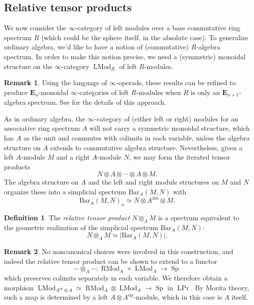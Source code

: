 \documentclass[12pt]{article}
\theoremstyle{definition}
\newtheorem{definition}{Definition}[subsection]
\newtheorem{remark}{Remark}[subsection]
\newcommand{\EE}{\mathbf{E}}
\newcommand{\too}{\longrightarrow}
\newcommand{\op}{\mathrm{op}}
\DeclareMathOperator{\LMod}{LMod}
\DeclareMathOperator{\RMod}{RMod}
\DeclareMathOperator{\Prl}{LPr}
\DeclareMathOperator{\Sp}{Sp}
\begin{document}
\subsection{Relative tensor products}\label{sec:rtp}


We now consider the $\infty$-category of left modules over a base commutative ring spectrum $R$ (which could be the sphere itself, in the absolute case).
To generalize ordinary algebra, we'd like to have a notion of (commutative) $R$-algebra spectrum.
In order to make this notion precise, we need a (symmetric) monoidal structure on the $\infty$-category $\LMod_R$ of left $R$-modules.
\begin{remark}
Using the language of $\infty$-operads, these results can be refined to produce $\EE_n$-monoidal $\infty$-categories of left $R$-modules when $R$ is only an $\EE_{n+1}$-algebra spectrum.
See \cite{HA} for the details of this approach.
\end{remark}

As in ordinary algebra, the $\infty$-category of (either left or right) modules for an associative ring spectrum $A$ will not carry a symmetric monoidal structure, which has $A$ as the unit and commutes with colimits in each variable, unless the algebra structure on $A$ extends to commutative algebra structure.
Nevertheless, given a left $A$-module $M$ and a right $A$-module $N$, we may form the iterated tensor products
\[
N\otimes A\otimes\cdots\otimes A\otimes M.
\]
The algebra structure on $A$ and the left and right module structures on $M$ and $N$ organize these into a simplicial spectrum $\mathrm{Bar}_A(M,N)$ with
\[
\mathrm{Bar}_A(M,N)_n\simeq N\otimes A^{\otimes n}\otimes M.
\]
\begin{definition}
The {\em relative tensor product} $N\otimes_A M$ is a spectrum equivalent to the geometric realization of the simplicial spectrum $\mathrm{Bar}_A(M,N)$:
\[
N\otimes_A M\simeq |\mathrm{Bar}_A(M,N)|.
\]
\end{definition}
\begin{remark}
No noncanonical choices were involved in this construction, and indeed the relative tensor product can be shown to extend to a functor
\[
-\otimes_A -\colon\RMod_A\times\LMod_A\too\Sp
\]
which preserves colimits separately in each variable.
We therefore obtain a morphism $\LMod_{A^{\op}\otimes A}\simeq\RMod_A\otimes\LMod_A\to\Sp$ in $\Prl$.
By Morita theory, such a map is determined by a left $A\otimes A^{\op}$-module, which in this case is $A$ itself.
\end{remark}
\end{document}
